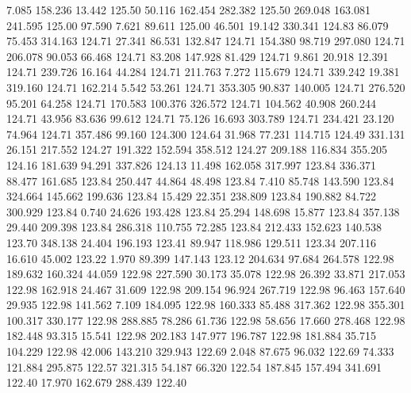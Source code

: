   7.085  158.236   13.442       125.50
  50.116  162.454  282.382       125.50
 269.048  163.081  241.595       125.00
  97.590    7.621   89.611       125.00
  46.501   19.142  330.341       124.83
  86.079   75.453  314.163       124.71
  27.341   86.531  132.847       124.71
 154.380   98.719  297.080       124.71
 206.078   90.053   66.468       124.71
  83.208  147.928   81.429       124.71
   9.861   20.918   12.391       124.71
 239.726   16.164   44.284       124.71
 211.763    7.272  115.679       124.71
 339.242   19.381  319.160       124.71
 162.214    5.542   53.261       124.71
 353.305   90.837  140.005       124.71
 276.520   95.201   64.258       124.71
 170.583  100.376  326.572       124.71
 104.562   40.908  260.244       124.71
  43.956   83.636   99.612       124.71
  75.126   16.693  303.789       124.71
 234.421   23.120   74.964       124.71
 357.486   99.160  124.300       124.64
  31.968   77.231  114.715       124.49
 331.131   26.151  217.552       124.27
 191.322  152.594  358.512       124.27
 209.188  116.834  355.205       124.16
 181.639   94.291  337.826       124.13
  11.498  162.058  317.997       123.84
 336.371   88.477  161.685       123.84
 250.447   44.864   48.498       123.84
   7.410   85.748  143.590       123.84
 324.664  145.662  199.636       123.84
  15.429   22.351  238.809       123.84
 190.882   84.722  300.929       123.84
   0.740   24.626  193.428       123.84
  25.294  148.698   15.877       123.84
 357.138   29.440  209.398       123.84
 286.318  110.755   72.285       123.84
 212.433  152.623  140.538       123.70
 348.138   24.404  196.193       123.41
  89.947  118.986  129.511       123.34
 207.116   16.610   45.002       123.22
   1.970   89.399  147.143       123.12
 204.634   97.684  264.578       122.98
 189.632  160.324   44.059       122.98
 227.590   30.173   35.078       122.98
  26.392   33.871  217.053       122.98
 162.918   24.467   31.609       122.98
 209.154   96.924  267.719       122.98
  96.463  157.640   29.935       122.98
 141.562    7.109  184.095       122.98
 160.333   85.488  317.362       122.98
 355.301  100.317  330.177       122.98
 288.885   78.286   61.736       122.98
  58.656   17.660  278.468       122.98
 182.448   93.315   15.541       122.98
 202.183  147.977  196.787       122.98
 181.884   35.715  104.229       122.98
  42.006  143.210  329.943       122.69
   2.048   87.675   96.032       122.69
  74.333  121.884  295.875       122.57
 321.315   54.187   66.320       122.54
 187.845  157.494  341.691       122.40
  17.970  162.679  288.439       122.40

